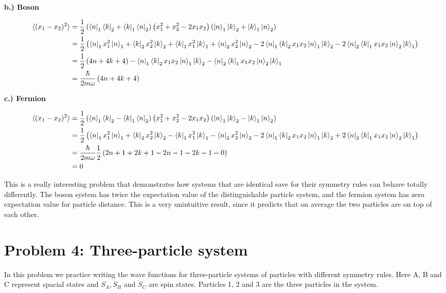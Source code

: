\documentclass[10pt]{article} %
\begin{document}
\textbf{b.) Boson}

\begin{align*}
  \braket{(x_1-x_2)^2} &=
  \frac{1}{2}\left(\bra{n}_1\bra{k}_2 + \bra{k}_1\bra{n}_2\right)
  \left(x_1^2 + x_2^2 - 2x_1x_2\right)
  \left(\ket{n}_1\ket{k}_2 + \ket{k}_1\ket{n}_2\right)\\
  &= \frac{1}{2}\left(
  \bra{n}_1x_1^2\ket{n}_1 + \bra{k}_2x_2^2\ket{k}_2
  + \bra{k}_1x_1^2\ket{k}_1 + \bra{n}_2x_2^2\ket{n}_2
  - 2\bra{n}_1\bra{k}_2x_1x_2\ket{n}_1\ket{k}_2 - 2\bra{n}_2\bra{k}_1x_1x_2\ket{n}_2\ket{k}_1\right)\\
  &= \frac{1}{2}\left(4n + 4k + 4\right)
  - \bra{n}_1\bra{k}_2x_1x_2\ket{n}_1\ket{k}_2 - \bra{n}_2\bra{k}_1x_1x_2\ket{n}_2\ket{k}_1\\
  &= \frac{\hbar}{2m\omega}\left(4n + 4k + 4\right)\\
\end{align*}

\textbf{c.) Fermion}

\begin{align*}
  \braket{(x_1-x_2)^2} &=
  \frac{1}{2}\left(\bra{n}_1\bra{k}_2 - \bra{k}_1\bra{n}_2\right)
  \left(x_1^2 + x_2^2 - 2x_1x_2\right)
  \left(\ket{n}_1\ket{k}_2 - \ket{k}_1\ket{n}_2\right)\\
  &= \frac{1}{2}\left(
  \bra{n}_1x_1^2\ket{n}_1 + \bra{k}_2x_2^2\ket{k}_2
  - \bra{k}_1x_1^2\ket{k}_1 - \bra{n}_2x_2^2\ket{n}_2
  - 2\bra{n}_1\bra{k}_2x_1x_2\ket{n}_1\ket{k}_2 + 2\bra{n}_2\bra{k}_1x_1x_2\ket{n}_2\ket{k}_1\right)\\
  &= \frac{\hbar}{2m\omega}\frac{1}{2}\left(2n+1 + 2k+1 - 2n-1 - 2k-1 - 0\right)\\
  &= 0\\
\end{align*}

This is a really interesting problem that demonstrates how systems that are identical save
for their symmetry rules can behave totally differently. The boson system has twice the expectation
value of the distinguishable particle system, and the fermion system has zero expectation value
for particle distance. This is a very unintuitive result, since it predicts that on average the
two particles are on top of each other.\\

\section{Problem 4: Three-particle system}
In this problem we practice writing the wave functions for three-particle systems of particles
with different symmetry rules. Here A, B and C represent spacial states and $S_A, S_B$ and $S_C$ are
spin states. Particles 1, 2 and 3 are the three particles in the system.\\
\end{document}
